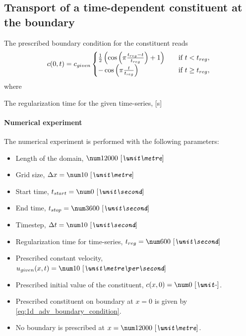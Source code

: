 \subsection{Transport of a time-dependent constituent at the boundary}
\label{sec:numerical_experiment_1d_adv_time_dependent_boundary}
The prescribed boundary condition for the constituent reads
\begin{align}
    c(0,t) = c_{\mathit given}
    \begin{cases}
        \frac{1}{2} \left(\cos\left(\pi \frac{t_{reg} - t}{t_{reg}}\right) + 1  \right) &\quad \text{if } t < t_{reg},
        \\
        -\cos\left(\pi \frac{t}{t_{\mathit reg}} \right) &\quad \text{if } t \geq t_{reg},
    \end{cases}
    \label{eq:1d_adv_sine_boundary_condition}
\end{align}
where
\begin{symbollist}
    \item[$t_{reg}$] The regularization time for the given time-series, [\si{\second}]
\end{symbollist}
\paragraph*{Numerical experiment}
The numerical experiment is performed with the following parameters:
\begin{itemize}
    \item Length of the domain, $\bqty{12000}{\metre}$
    \item Grid size, $\Dx = \bqty{10}{\metre}$
    \item Start time, $t_{start} = \bqty{0}{\second}$
    \item End time, $t_{stop} = \bqty{3600}{\second}$
    \item Timestep, $\Dt = \bqty{10}{\second}$
    \item Regularization time for time-series, $t_{reg} = \bqty{600}{\second}$
    \item Prescribed constant velocity, $u_{\mathit given}(x,t) = \bqty{10}{\metre\per\second}$
    \item Prescribed initial value of the constituent, $c(x,0)= \bqty{0}{-}$.
    \item Prescribed constituent on boundary at $x=0$ is given by \autoref{eq:1d_adv_boundary_condition}.
    \item No boundary is prescribed at $x=\bqty{12000}{\metre}$.
\end{itemize}
